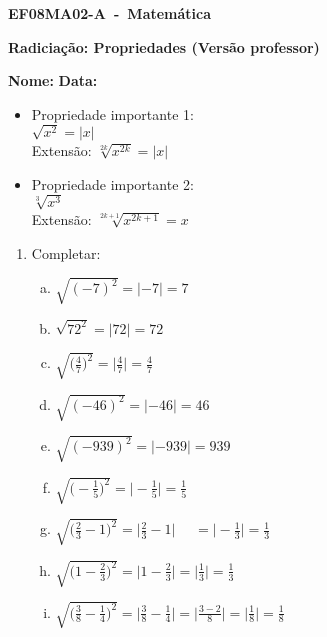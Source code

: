 \documentclass[a4paper,14pt]{article}
\begin{document}
	
	\noindent\textbf{EF08MA02-A~-~Matemática} 
	
	\begin{center}
		\textbf{Radiciação: Propriedades (Versão professor)}
	\end{center}
	
	
	\noindent\textbf{Nome:} \underline{\hspace{10cm}}
    \noindent\textbf{Data:} \underline{\hspace{4cm}}
	
	
	\begin{multicols}{2}
    \begin{itemize}
    	\item Propriedade importante 1: \\
    	$\sqrt{x^2} = |x|$ \\
    	Extensão: $ \sqrt[2k]{x^{2k}} = |x|$ \\
    	\item Propriedade importante 2: \\
    	$\sqrt[3]{x^3}$ \\
    	Extensão: $\sqrt[{2k + 1}]{x^{2k + 1}} = x$
    \end{itemize}
	\begin{enumerate}
		
		\item Completar:
		\begin{enumerate}[a)]
			\item $\sqrt{(-7)^2} = |-7| = 7$
			\item $\sqrt{72^2} = |72| = 72$
			\item $\sqrt{\bigg(\frac{4}{7}\bigg)^2} = \bigg| \frac{4}{7} \bigg| = \frac{4}{7}$
			\item $\sqrt{(-46)^2} = |-46| = 46$
			\item $\sqrt{(-939)^2} = |-939| = 939$
			\item $\sqrt{\bigg(-\frac{1}{5}\bigg)^2} = \bigg|-\frac{1}{5} \bigg| = \frac{1}{5}$
			\item $\sqrt{\bigg(\frac{2}{3}-1\bigg)^2} = \bigg| \frac{2}{3}-1 \bigg| ~~~~~~= \bigg| -\frac{1}{3} \bigg| = \frac{1}{3}$
			\item $\sqrt{\bigg(1-\frac{2}{3}\bigg)^2} = \bigg| 1 - \frac{2}{3}\bigg| = \bigg| \frac{1}{3} \bigg| = \frac{1}{3}$ 
			\item $\sqrt{\bigg(\frac{3}{8} - \frac{1}{4}\bigg)^2} = \bigg| \frac{3}{8} - \frac{1}{4} \bigg| = \bigg| \frac{3-2}{8} \bigg| = \bigg| \frac{1}{8} \bigg| = \frac{1}{8}$
			

\end{enumerate}
\end{enumerate}
\end{multicols}
\end{document}
